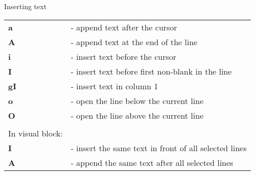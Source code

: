 \documentclass[a4paper,8pt]{extarticle}
\begin{document}
\begin{multicols*}{3}
        \noindent
        {\Huge Inserting text}\\
        \begin{tabular}{ l l }
            \textbf{a}                          &    - append text after the cursor                         \\
            \textbf{A}                          &    - append text at the end of the line                   \\
            \textbf{i}                          &    - insert text before the cursor                        \\
            \textbf{I}                          &    - insert text before first non-blank in the line       \\
            \textbf{gI}                         &    - insert text in column 1                              \\
            \textbf{o}                          &    - open the line below the current line                 \\
            \textbf{O}                          &    - open the line above the current line                 \\
                                                &                                                           \\
            In visual block:                    &                                                           \\
            \textbf{I}                          &    - insert the same text in front of all selected lines  \\
            \textbf{A}                          &    - append the same text after all selected lines        \\
        \end{tabular}


\end{multicols*}
\end{document}
